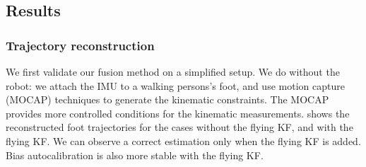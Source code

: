 \subsection{Results}
\subsubsection{Trajectory reconstruction}

We first validate our fusion method on a simplified setup. We do without the robot: we attach the IMU to a walking persons's foot, and use motion capture (MOCAP) techniques to generate the kinematic constraints. 
The MOCAP provides more controlled conditions for the kinematic measurements.
 shows the reconstructed foot trajectories for the cases without the flying KF, and with the flying KF. We can observe a correct estimation only when the flying KF is added. Bias autocalibration is also more stable with the flying KF.

%


